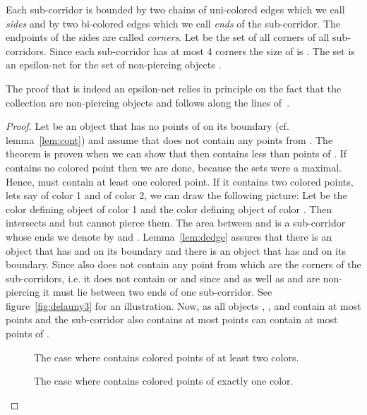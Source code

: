 \documentclass{stacs_proc}
\begin{document}
Each sub-corridor is bounded by two chains of uni-colored edges which
we call \emph{sides} and by two bi-colored edges which we call
\emph{ends} of the sub-corridor. The endpoints of the sides are called
\emph{corners}. Let  be the set of all corners of all
sub-corridors. Since each sub-corridor has at most 4 corners the size
of  is . 
The set  is an epsilon-net for the set of non-piercing objects
.

The proof that  is indeed an epsilon-net relies in principle on the
fact that the collection  are non-piercing objects and follows
along the lines of~\cite{MSW90}. 
\begin{proof}
  Let  be an object that has no points of  on its boundary
  (cf. lemma~\ref{lem:cont}) and assume that  does not contain any
  points from . The theorem is proven when we can show that 
  then contains less than  points of . If  contains no
  colored point then we are done, because the sets  were a
  maximal. Hence,  must contain at least one colored point. If it
  contains two colored points, lets say  of color 1 and  of
  color 2, we can draw the following picture: Let  be the color
  defining object of color 1 and  the color defining object of
  color . Then  intersects  and  but cannot pierce
  them. The area between  and  is a sub-corridor whose ends
  we denote by  and . Lemma~\ref{lem:dedge}
  assures that there is an object  that has  and  on
  its boundary and there is an object  that has  and 
  on its boundary. Since  also does not contain any point from 
  which are the corners of the sub-corridors, i.e. it does not contain
   or  and since  and  as well as  and
   are non-piercing it must lie between two ends of one
  sub-corridor. See figure~\ref{fig:delauny3} for an
  illustration. Now, as all objects , ,  and 
  contain at most  points and the sub-corridor also contains at
  most  points  can contain at most 
  points of . 
\begin{figure}
\vspace{-2ex}
\begin{minipage}{0.45\textwidth}
  \begin{center}
    \vspace{-1ex}
    \caption{The case where  contains colored points of at least
      two colors.} 
    \label{fig:delauny3}
  \end{center}
\end{minipage}\hfill
\begin{minipage}{0.45\textwidth}
  \begin{center}
     \vspace{-1ex}
    \caption{The case where  contains colored points of exactly one
      color.} 
    \label{fig:delauny4}
  \end{center}
\end{minipage}
\end{figure}


\end{proof}
\end{document}
